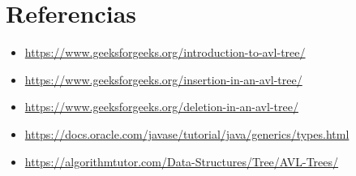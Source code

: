 \documentclass{article}
\begin{document}
\clearpage		
\section{Referencias}
\begin{itemize}			
	\item \url{https://www.geeksforgeeks.org/introduction-to-avl-tree/}
	\item \url{https://www.geeksforgeeks.org/insertion-in-an-avl-tree/}
	\item \url{https://www.geeksforgeeks.org/deletion-in-an-avl-tree/}
	\item \url{https://docs.oracle.com/javase/tutorial/java/generics/types.html}
	\item \url{https://algorithmtutor.com/Data-Structures/Tree/AVL-Trees/}

\end{itemize}	

	
%
%
%
			
\end{document}
